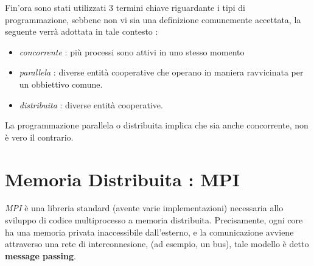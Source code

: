 \documentclass[10pt, letterpaper]{report}
\begin{document}
Fin'ora sono stati utilizzati 3 termini chiave riguardante i tipi di programmazione,
 sebbene non vi sia una definizione comunemente accettata, 
la seguente verrà adottata in tale contesto : \begin{itemize}
    \item \textit{concorrente} : più processi sono attivi in uno stesso momento 
    \item \textit{parallela} : diverse entità cooperative che operano in maniera ravvicinata per 
    un obbiettivo comune.
    \item \textit{distribuita} : diverse entità cooperative.
\end{itemize}
La programmazione parallela o distribuita implica che sia anche concorrente, non è vero il contrario.
\chapter{Memoria Distribuita : MPI}
\textit{MPI} è una libreria standard (avente varie implementazioni) necessaria allo sviluppo di codice multiprocesso 
a memoria distribuita. Precisamente, ogni core ha una memoria privata inaccessibile dall'esterno, e la comunicazione 
avviene attraverso una rete di interconnesione, (ad esempio, un bus), tale modello è detto \textbf{message 
passing}.
\end{document}
